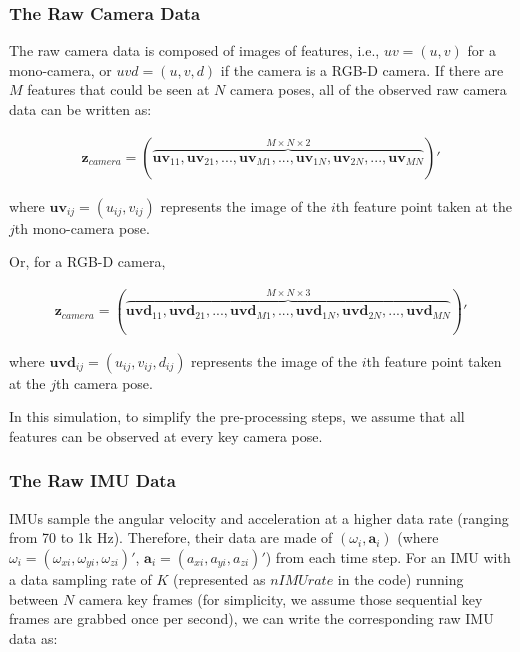 \documentclass[12pt]{article}   %
\begin{document}
\subsubsection{The Raw Camera Data}

The raw camera data is composed of images of features, i.e., $uv = (u, v)$ for a mono-camera, or $uvd = (u, v, d)$ if the camera is a RGB-D camera. If there are $M$ features that could be seen at $N$ camera poses, all of the observed raw camera data can be written as:

\begin{align}
\textbf{z}_{camera} = (\overbrace{\textbf{uv}_{11}, \textbf{uv}_{21}, ... , \textbf{uv}_{M1}, ..., \textbf{uv}_{1N}, \textbf{uv}_{2N}, ... , \textbf{uv}_{MN}}^{M \times N \times 2})'
\end{align}

where $\textbf{uv}_{ij} = (u_{ij}, v_{ij})$ represents the image of the $i$th feature point taken at the $j$th mono-camera pose.

Or, for a RGB-D camera,

\begin{align}
\textbf{z}_{camera} = (\overbrace{\textbf{uvd}_{11}, \textbf{uvd}_{21}, ... , \textbf{uvd}_{M1}, ..., \textbf{uvd}_{1N}, \textbf{uvd}_{2N}, ... , \textbf{uvd}_{MN}}^{M \times N \times 3})'
\end{align}

where $\textbf{uvd}_{ij} = (u_{ij}, v_{ij}, d_{ij})$ represents the image of the $i$th feature point taken at the $j$th camera pose.

In this simulation, to simplify the pre-processing steps, we assume that all features can be observed at every key camera pose.

\subsubsection{The Raw IMU Data}

IMUs sample the angular velocity and acceleration at a higher data rate (ranging from 70 to 1k Hz). Therefore, their data are made of $(\omega _i, \textbf{a}_i)$ (where $\omega _i = (\omega _{xi}, \omega _{yi}, \omega _{zi})'$,  $\textbf{a}_i = (a _{xi}, a_{yi}, a_{zi})'$) from each time step. For an IMU with a data sampling rate of $K$ (represented as $nIMUrate$ in the code) running between $N$ camera key frames (for simplicity, we assume those sequential key frames are grabbed once per second), we can write the corresponding raw IMU data as:
\end{document}
